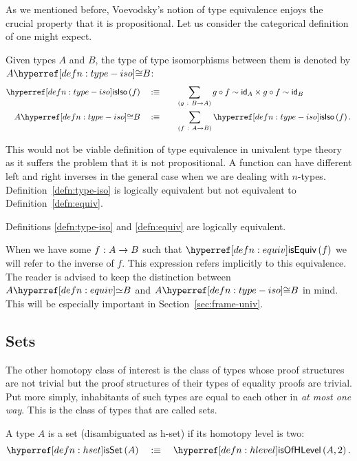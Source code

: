 As we mentioned before, Voevodsky's notion of type equivalence enjoys the crucial property
that it is propositional. Let us consider the categorical definition of one might expect.
\begin{defn}\label{defn:type-iso}
  Given types $A$ and $B$, the type of type isomorphisms between them is denoted by
  $\typiso{A}{B}$:
  \begin{alignat*}{2}
    \istypiso{f}   \quad&\is\quad && \sigmaty{g}{B \rightarrow A}{g \circ f \sim \idfn{A} \times g \circ f \sim \idfn{B}} \\
    \typiso{A}{B} \quad&\is\quad &&\sigmaty{f}{A \rightarrow B}{\istypiso{f}}                          .
  \end{alignat*}
\end{defn}

This would not be viable definition of type equivalence in univalent type theory as it
suffers the problem that it is not propositional. A function can have different left and
right inverses in the general case when we are dealing with $n$-types.
Definition~\ref{defn:type-iso} is logically equivalent but not equivalent to
Definition~\ref{defn:equiv}.

\begin{prop}
  Definitions \ref{defn:type-iso} and \ref{defn:equiv} are logically equivalent.
\end{prop}

When we have some $f\hspace{0.1mm}:\hspace{0.1mm}A \rightarrow B$ such that $\isequiv{f}$ we will refer to the inverse
of $f$. This expression refers implicitly to this equivalence. The reader is advised to
keep the distinction between $\typequiv{A}{B}$ and $\typiso{A}{B}$ in mind. This will be
especially important in Section~\ref{sec:frame-univ}.

\subsection{Sets}

The other homotopy class of interest is the class of types whose proof structures are not
trivial but the proof structures of their types of equality proofs are trivial. Put more
simply, inhabitants of such types are equal to each other in \emph{at most one way}. This
is the class of types that are called sets.
\begin{defn}[Set]\label{defn:hset}
  A type $A$ is a set (disambiguated as h-set) if its homotopy level is two:
  \begin{equation*}
    \isset{A} \quad\is\quad \isofhlevel{A}{2}.
  \end{equation*}
\end{defn}

